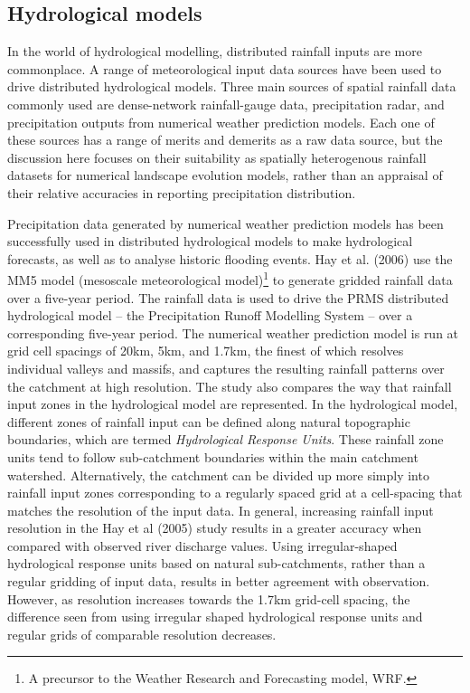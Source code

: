 \subsection{Hydrological models}
In the world of hydrological modelling, distributed rainfall inputs are more commonplace. A range of meteorological input data sources have been used to drive distributed hydrological models. Three main sources of spatial rainfall data commonly used are dense-network rainfall-gauge data, precipitation radar, and precipitation outputs from numerical weather prediction models. Each one of these sources has a range of merits and demerits as a raw data source, but the discussion here focuses on their suitability as spatially heterogenous rainfall datasets for numerical landscape evolution models, rather than an appraisal of their relative accuracies in reporting precipitation distribution.

Precipitation data generated by numerical weather prediction models has been successfully used in distributed hydrological models to make hydrological forecasts, as well as to analyse historic flooding events. Hay et al. (2006) use the MM5 model (mesoscale meteorological model)\footnote{A precursor to the Weather Research and Forecasting model, WRF.} to generate gridded rainfall data over a five-year period.  The rainfall data is used to drive the PRMS distributed hydrological model -- the Precipitation Runoff Modelling System -- over a corresponding five-year period. The numerical weather prediction model is run at grid cell spacings of 20km, 5km, and 1.7km, the finest of which resolves individual valleys and massifs, and captures the resulting rainfall patterns over the catchment at high resolution. The study also compares the way that rainfall input zones in the hydrological model are represented. In the hydrological model, different zones of rainfall input can be defined along natural topographic boundaries, which are termed \textit{Hydrological Response Units}. These rainfall zone units tend to follow sub-catchment boundaries within the main catchment watershed. Alternatively, the catchment can be divided up more simply into rainfall input zones corresponding to a regularly spaced grid at a cell-spacing that matches the resolution of the input data.
In general, increasing rainfall input resolution in the Hay et al (2005) study results in a greater accuracy when compared with observed river discharge values. Using irregular-shaped hydrological response units based on natural sub-catchments, rather than a regular gridding of input data, results in better agreement with observation. However, as resolution increases towards the 1.7km grid-cell spacing, the difference seen from using irregular shaped hydrological response units and regular grids of comparable resolution decreases. 

